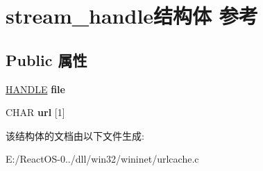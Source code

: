 \hypertarget{structstream__handle}{}\section{stream\+\_\+handle结构体 参考}
\label{structstream__handle}
\subsection*{Public 属性}
\begin{DoxyCompactItemize}
\item 
\mbox{\label{structstream__handle_a1d7bcff83381aab51126e1325053cf45}} 
\hyperlink{interfacevoid}{H\+A\+N\+D\+LE} {\bfseries file}
\item 
\mbox{\label{structstream__handle_a3a8bebd8851e083f6a5b447a32f9add3}} 
C\+H\+AR {\bfseries url} \mbox{[}1\mbox{]}
\end{DoxyCompactItemize}


该结构体的文档由以下文件生成\+:\begin{DoxyCompactItemize}
\item 
E\+:/\+React\+O\+S-\/0../dll/win32/wininet/urlcache.\+c\end{DoxyCompactItemize}
